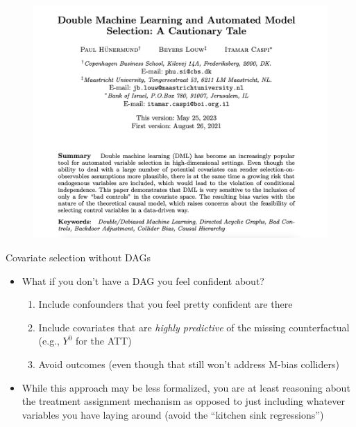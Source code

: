 \documentclass{beamer}
\begin{document}
\begin{frame}{}

  \begin{figure}
    \includegraphics[scale=0.25]{./lecture_includes/paul_dml}
  \end{figure}

\end{frame}




\begin{frame}{Covariate selection without DAGs}

\begin{itemize}
\item What if you don't have a DAG you feel confident about?  
	\begin{enumerate}
	\item Include confounders that you feel pretty confident are there 
	\item Include covariates that are \emph{highly predictive} of the missing counterfactual (e.g., $Y^0$ for the ATT)
	\item Avoid outcomes (even though that still won't address M-bias colliders)
	\end{enumerate}
\item While this approach may be less formalized, you are at least reasoning about the treatment assignment mechanism as opposed to just including whatever variables you have laying around (avoid the ``kitchen sink regressions'')
\end{itemize}

\end{frame}
\end{document}
